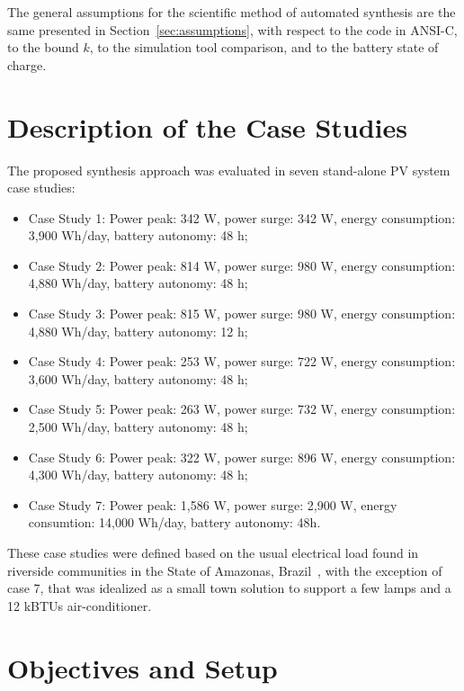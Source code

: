 The general assumptions for the scientific method of automated synthesis are the same presented in Section~\ref{sec:assumptions}, with respect to the code in ANSI-C, to the bound $k$, to the simulation tool comparison, and to the battery state of charge.

\section{Description of the Case Studies} 

The proposed synthesis approach was evaluated in  seven stand-alone PV system case studies: 

\begin{itemize}
\item Case Study 1: Power peak: 342 W, power surge: 342 W, energy consumption: 3,900 Wh/day, battery autonomy: 48 h;
\item Case Study 2: Power peak: 814 W, power surge: 980 W, energy consumption: 4,880 Wh/day, battery autonomy: 48 h;
\item Case Study 3: Power peak: 815 W, power surge: 980 W, energy consumption: 4,880 Wh/day, battery autonomy: 12 h;
\item Case Study 4: Power peak: 253 W, power surge: 722 W, energy consumption: 3,600 Wh/day, battery autonomy: 48 h;
\item Case Study 5: Power peak: 263 W, power surge: 732 W, energy consumption: 2,500 Wh/day, battery autonomy: 48 h;
\item Case Study 6: Power peak: 322 W, power surge: 896 W, energy consumption: 4,300 Wh/day, battery autonomy: 48 h;
\item Case Study 7: Power peak: 1,586 W, power surge: 2,900 W, energy consumtion: 14,000 Wh/day, battery autonomy: 48h.
\end{itemize}

These case studies were defined based on the usual electrical load found in riverside communities in the State of Amazonas,  Brazil~\cite{TrindadeCordeiro19, Agrener2013}, with the exception of case 7, that was idealized as a small town solution to support a few lamps and a 12 kBTUs air-conditioner.

\section{Objectives and Setup}
\label{sec:synthesissetup} 

